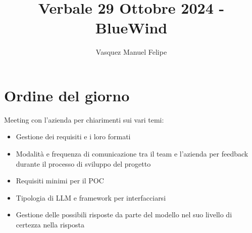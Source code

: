 \documentclass{TWReport}
\title{Verbale 29 Ottobre 2024 - BlueWind}
\author{Vasquez Manuel Felipe}
\begin{document}
	
	\frontmatter
	
	\showPartecipants
	
	\section*{Ordine del giorno}
	Meeting con l'azienda per chiarimenti sui vari temi:
	\begin{itemize}
		\item Gestione dei requisiti e i loro formati
		\item Modalità e frequenza di comunicazione tra il team e l'azienda per feedback durante il processo di sviluppo del progetto
		\item Requisiti minimi per il POC
		\item Tipologia di LLM e framework per interfacciarsi
		\item Gestione delle possibili risposte da parte del modello nel suo livello di certezza nella risposta
	\end{itemize}
	
\end{document}
